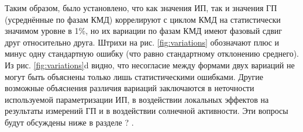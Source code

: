 Таким образом, было установлено, что как значения ИП, так и значения ГП (усреднённые по фазам КМД) коррелируют с циклом КМД на статистически значимом уровне в 1\%, но их вариации по фазам КМД имеют фазовый сдвиг друг относительно друга. Штрихи на рис. \ref{fig:variations} обозначают плюс и минус одну стандартную ошибку (что равно стандартному отклонению среднего). Из рис. \ref{fig:variations}{d} видно, что несогласие между формами двух вариаций не могут быть объяснены только лишь статистическими ошибками. Другие возможные объяснения различия вариаций заключаются в неточности используемой параметризации ИП, в воздействии локальных эффектов на результаты измерений ГП и в воздействии солнечной активности. Эти вопросы будут обсуждены ниже в разделе ? .